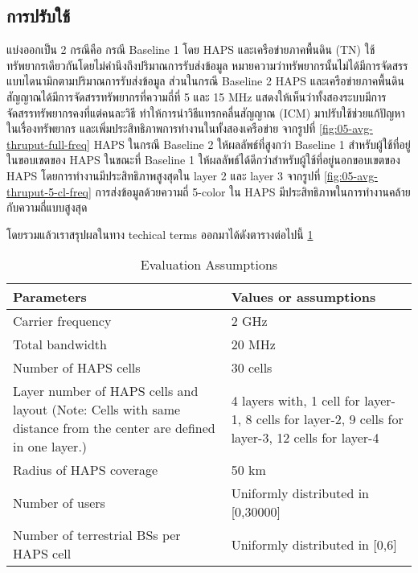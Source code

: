 \pagebreak

\subsection{การปรับใช้}

แบ่งออกเป็น 2 กรณีคือ กรณี Baseline 1 โดย HAPS และเครือข่ายภาคพื้นดิน (TN) ใช้ทรัพยากรเดียวกันโดยไม่คำนึงถึงปริมาณการรับส่งข้อมูล 
หมายความว่าทรัพยากรนั้นไม่ได้มีการจัดสรรแบบไดนามิกตามปริมาณการรับส่งข้อมูล ส่วนในกรณี Baseline 2 HAPS และเครือข่ายภาคพื้นดินสัญญาณได้มีการจัดสรรทรัพยากรที่ความถี่ที่ 5 และ 15 MHz 
แสดงให้เห็นว่าทั้งสองระบบมีการจัดสรรทรัพยากรคงที่แต่คนละวิธี ทำให้การนำวิธีแทรกคลื่นสัญญาณ (ICM) มาปรับใช้ช่วยแก้ปัญหาในเรื่องทรัพยากร
และเพิ่มประสิทธิภาพการทำงานในทั้งสองเครือข่าย จากรูปที่ \ref{fig:05-avg-thruput-full-freq} HAPS ในกรณี Baseline 2 ให้ผลลัพธ์ที่สูงกว่า Baseline 1 
สำหรับผู้ใช้ที่อยู่ในขอบเขตของ HAPS ในขณะที่ Baseline 1 ให้ผลลัพธ์ได้ดีกว่าสำหรับผู้ใช้ที่อยู่นอกขอบเขตของ HAPS โดยการทำงานมีประสิทธิภาพสูงสุดใน layer 2
และ layer 3 จากรูปที่ \ref{fig:05-avg-thruput-5-cl-freq} การส่งข้อมูลด้วยความถี่ 5-color ใน HAPS มีประสิทธิภาพในการทำงานคล้ายกับความถี่แบบสูงสุด

โดยรวมแล้วเราสรุปผลในทาง techical terms ออกมาได้ดังตารางต่อไปนี้ \ref{table:04-haps-evaluation}

\begin{table}[h]
\centering
\begin{tabular}[h]{| l | l |}
\hline
Parameters                      & Values or assumptions \\
\hline
Carrier frequency               & 2 GHz \\
\hline
Total bandwidth                 & 20 MHz \\
\hline
Number of HAPS cells            & 30 cells \\
\hline
\parbox[t]{12em}{Layer number of HAPS cells and layout (Note: Cells with same distance from the center are defined in one layer.)}        & \parbox[t]{12em}{4 layers with, 1 cell for layer-1, 8 cells for layer-2, 9 cells for layer-3, 12 cells for layer-4} \\
\hline
Radius of HAPS coverage         & 50 km \\
\hline
Number of users                 & Uniformly distributed in [0,30000] \\
\hline
Number of terrestrial BSs per HAPS cell & Uniformly distributed in [0,6]\\
\hline
\end{tabular}
\caption{Evaluation Assumptions} \label{table:04-haps-evaluation}
\end{table}

